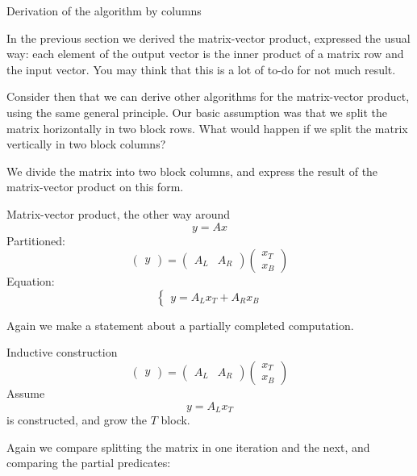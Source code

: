  {Derivation of the algorithm by columns}

In the previous section we derived the matrix-vector product,
expressed the usual way: each element of the output vector
is the inner product of a matrix row and the input vector.
You may think that this is a lot of to-do for not much result.

Consider then that we can derive other algorithms for the matrix-vector product,
using the same general principle.
Our basic assumption was that we split the matrix horizontally
in two block rows.
What would happen if we split the matrix vertically in two
block columns?

We divide the matrix into two block columns, and express the
result of the matrix-vector product on this form.

\begin{block}{Matrix-vector product, the other way around}
  \[ y = Ax \]
  Partitioned:
  \[
  \begin{pmatrix}
    y
  \end{pmatrix}
  =
  \begin{pmatrix}
    A_L & A_R
  \end{pmatrix}
  \begin{pmatrix}
    x_T \\ x_B
  \end{pmatrix}
  \]
  Equation:
  \[
  \begin{cases}
    y = A_L x_T + A_R x_B
  \end{cases}
  \]
\end{block}

Again we make a statement about a partially completed computation.

\begin{block}{Inductive construction}
  \[
  \begin{pmatrix}
    y
  \end{pmatrix}
  =
  \begin{pmatrix}
    A_L & A_R
  \end{pmatrix}
  \begin{pmatrix}
    x_T \\ x_B
  \end{pmatrix}
  \]
Assume 
  \[ y = A_L x_T \]
  is constructed, and grow the $T$ block.
\end{block}

Again we compare splitting the matrix in one iteration
and the next, and comparing the partial predicates:

